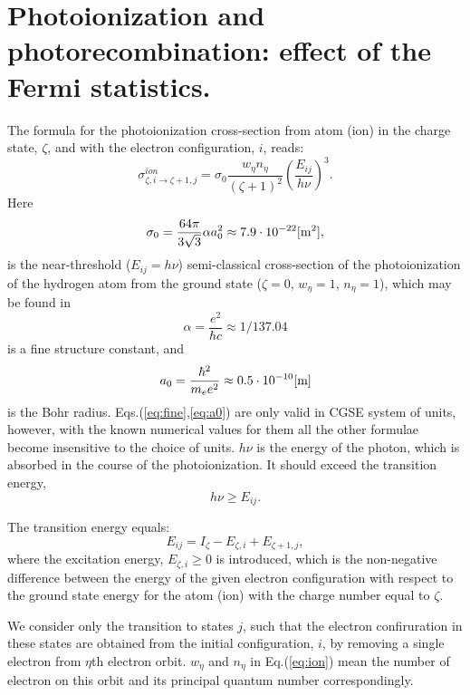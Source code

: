 \section{Photoionization and photorecombination: effect of the Fermi statistics.}
The formula for the photoionization cross-section from atom (ion) in the charge state, $\zeta$, and with the electron configuration, $i$, reads:
\begin{equation}\label{eq:ion}
\sigma^{ion}_{\zeta,i\rightarrow \zeta+1,j} = \sigma_0 \frac{w_\eta n_\eta}{(\zeta+1)^2}\left(\frac{E_{ij}}{h\nu}\right)^3.
\end{equation}
Here 
\begin{equation}
\sigma_0 =\frac{64\pi}{3\sqrt{3}}\alpha a_0^2\approx 7.9\cdot 10^{-22}[{\rm m}^2],
\end{equation}
is the near-threshold ($E_{ij}=h\nu$) semi-classical cross-section of the photoionization 
of the hydrogen atom from the ground state 
($\zeta = 0$, $w_\eta = 1$, $n_\eta = 1$), which may be found in \cite{ZR}
\begin{equation}\label{eq:fine}
\alpha = \frac{e^2}{\hbar c}\approx 1/137.04
\end{equation}
is a fine structure constant, and
\begin{equation}\label{eq:a0}
a_0 = \frac{\hbar^2}{m_e e^2}\approx 0.5\cdot 10^{-10}[\rm m]
\end{equation}
is the Bohr radius. Eqs.(\ref{eq:fine},\ref{eq:a0}) are only valid in CGSE system of 
units, however, with the known numerical values for them all the
other formulae become insensitive to the choice of units. $h\nu$ is the energy of the 
photon, which is absorbed in the course of the photoionization. It should exceed
the transition energy,
\begin{equation}
h\nu\ge E_{ij}.
\end{equation}

The transition energy equals:
\begin{equation}
E_{ij} = I_\zeta-E_{\zeta,i}+E_{\zeta+1,j},
\end{equation}
where the excitation energy, $E_{\zeta,i}\ge0$ is introduced, which is the non-negative 
difference between the energy of the given electron configuration with respect to 
the ground state energy for the atom (ion) with the charge number equal to $\zeta$.

We consider only the transition to states $j$, such that the electron confiruration in 
these states are obtained from the initial configuration, $i$, by removing a single 
electron from $\eta$th electron orbit. $w_\eta$ and $n_\eta$ in Eq.(\ref{eq:ion}) mean 
the number of electron on this orbit and its principal quantum number correspondingly.

